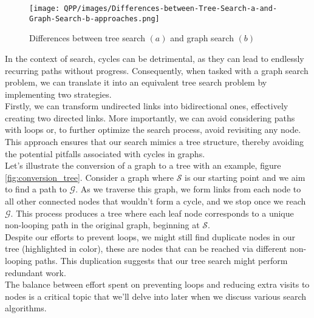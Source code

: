 \documentclass[a4paper,UKenglish,cleveref, autoref, thm-restate]{qlinhta}
\begin{document}
    \begin{figure}[H]
        \centering
        \texttt{[image: QPP/images/Differences-between-Tree-Search-a-and-Graph-Search-b-approaches.png]}
        \caption{Differences between tree search $(a)$ and graph search $(b)$}
        \label{fig:tree_graph_search}
    \end{figure}

    In the context of search, cycles can be detrimental, as they can lead to endlessly recurring paths without progress. Consequently, when tasked with a graph search problem, we can translate it into an equivalent tree search problem by implementing two strategies.\\

    Firstly, we can transform undirected links into bidirectional ones, effectively creating two directed links. More importantly, we can avoid considering paths with loops or, to further optimize the search process, avoid revisiting any node. This approach ensures that our search mimics a tree structure, thereby avoiding the potential pitfalls associated with cycles in graphs.\\

    Let's illustrate the conversion of a graph to a tree with an example, figure \ref{fig:conversion_tree}. Consider a graph where $\mathcal{S}$ is our starting point and we aim to find a path to $\mathcal{G}$. As we traverse this graph, we form links from each node to all other connected nodes that wouldn't form a cycle, and we stop once we reach $\mathcal{G}$. This process produces a tree where each leaf node corresponds to a unique non-looping path in the original graph, beginning at $\mathcal{S}$.\\

    Despite our efforts to prevent loops, we might still find duplicate nodes in our tree (highlighted in color), these are nodes that can be reached via different non-looping paths. This duplication suggests that our tree search might perform redundant work.\\

    The balance between effort spent on preventing loops and reducing extra visits to nodes is a critical topic that we'll delve into later when we discuss various search algorithms.\\
\end{document}
